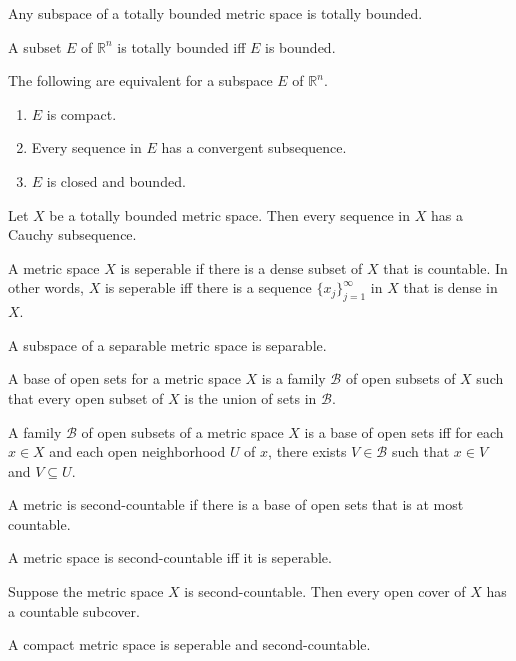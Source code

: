 \documentclass[nobib,notoc]{tufte-handout}
\begin{document}
\begin{lem}
	Any subspace of a totally bounded metric space is totally bounded.
\end{lem}
\begin{lem}
	A subset \(E\) of \(\mathbb{R}^n\) is totally bounded iff \(E\) is bounded.
\end{lem}
\begin{thm}
	The following are equivalent for a subspace \(E\) of \(\mathbb{R}^n\).
	\begin{enumerate}
		\item \(E\) is compact.
		\item Every sequence in \(E\) has a convergent subsequence.
		\item \(E\) is closed and bounded.
	\end{enumerate}
\end{thm}
\begin{thm}
	Let \(X\) be a totally bounded metric space. Then every sequence in \(X\) has a Cauchy subsequence.
\end{thm}
\begin{defi}[Seperability]
	A metric space \(X\) is seperable if there is a dense subset of \(X\) that is countable. In other words, \(X\) is seperable iff there is a sequence \(\{x_j\}_{j=1}^{\infty}\) in \(X\) that is dense in \(X\).
\end{defi}
\begin{thm}
	A subspace of a separable metric space is separable.
\end{thm}
\begin{defi}[Base]
	A base of open sets for a metric space \(X\) is a family \(\mathscr{B}\) of open subsets of \(X\) such that every open subset of \(X\) is the union of sets in \(\mathscr{B}\).
\end{defi}
\begin{lem}
	A family \(\mathscr{B}\) of open subsets of a metric space \(X\) is a base of open sets iff for each \(x\in X\) and each open neighborhood \(U\) of \(x\), there exists \(V\in\mathscr{B}\) such that \(x\in V\) and \(V\subseteq U\).
\end{lem}
\begin{defi}
	A metric is second-countable if there is a base of open sets that is at most countable.
\end{defi}
\begin{thm}
	A metric space is second-countable iff it is seperable.
\end{thm}
\begin{thm}
	Suppose the metric space \(X\) is second-countable. Then every open cover of \(X\) has a countable subcover.
\end{thm}
\begin{thm}
	A compact metric space is seperable and second-countable.
\end{thm}
\end{document}
